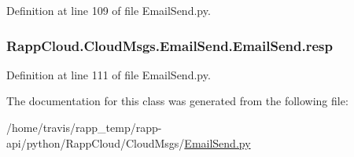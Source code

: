 Definition at line 109 of file Email\-Send.\-py.

\hypertarget{classRappCloud_1_1CloudMsgs_1_1EmailSend_1_1EmailSend_ab5b29d6fe642d0579be6d00a785a90b0}{
\subsubsection[{resp}]{\setlength{\rightskip}{0pt plus 5cm}Rapp\-Cloud.\-Cloud\-Msgs.\-Email\-Send.\-Email\-Send.\-resp}}\label{classRappCloud_1_1CloudMsgs_1_1EmailSend_1_1EmailSend_ab5b29d6fe642d0579be6d00a785a90b0}


Definition at line 111 of file Email\-Send.\-py.



The documentation for this class was generated from the following file\-:\begin{DoxyCompactItemize}
\item 
/home/travis/rapp\-\_\-temp/rapp-\/api/python/\-Rapp\-Cloud/\-Cloud\-Msgs/\hyperlink{EmailSend_8py}{Email\-Send.\-py}\end{DoxyCompactItemize}
